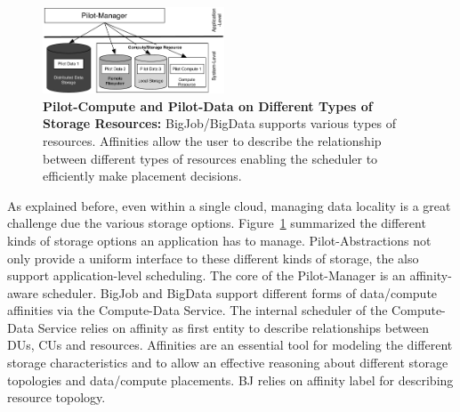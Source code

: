 \documentclass[times]{cpeauth}
\newcommand{\pilot}{Pilot\xspace}
\newcommand{\computedataservice}{Compute-Data Service\xspace}
\newcommand{\dus}{DUs\xspace}
\newcommand{\cus}{CUs\xspace}
\begin{document}
% 


\begin{figure}
	\centering
		\includegraphics[width=0.48\textwidth]{figures/storage-types.pdf}
                \caption{\textbf{Pilot-Compute and Pilot-Data on Different
                                Types of Storage Resources:} BigJob/BigData 
				supports various types of resources. Affinities allow the user 
				to describe the 
				relationship between different types of resources enabling the 
				scheduler to efficiently make placement decisions. }
	\label{fig:figures_storage-types}
\end{figure}

As explained before, even within a single cloud, managing data locality is a
great challenge due the various storage options.
Figure~\ref{fig:figures_storage-types} summarized the different kinds of
storage options an application has to manage. \pilot-Abstractions not only
provide a uniform interface to these different kinds of storage, the also
support application-level scheduling. The core of the \pilot-Manager is an
affinity-aware scheduler. BigJob and BigData support different forms of
data/compute affinities via the \computedataservice. The internal scheduler of
the \computedataservice relies on affinity as first entity to describe
relationships between \dus, \cus and resources. Affinities are an essential
tool for modeling the different storage characteristics and to allow an
effective reasoning about different storage topologies and data/compute
placements. BJ relies on affinity label for describing resource topology.
\end{document}
